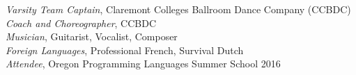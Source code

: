 \textit{Varsity Team Captain}, Claremont Colleges Ballroom Dance Company (CCBDC)  \\
\textit{Coach and Choreographer}, CCBDC\\
\textit{Musician}, Guitarist, Vocalist, Composer\\
\textit{Foreign Languages}, Professional French, Survival Dutch \\
\textit{Attendee}, Oregon Programming Languages Summer School 2016
